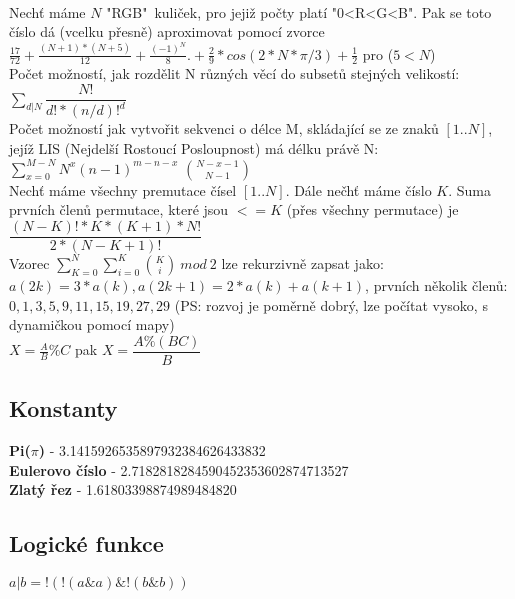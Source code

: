 \documentclass[11pt]{article}
\begin{document}
\\Nechť máme $N$ "RGB"\ kuliček, pro jejiž počty platí "0<R<G<B". Pak se toto číslo dá (vcelku přesně) aproximovat pomocí zvorce $\frac{17}{72}+\frac{(N+1)*(N+5)}{12}+\frac{(-1)^N}{8}.+\frac{2}{9}*cos(2*N*\pi/3)+\frac{1}{2}$ pro ($5<N$)
\\Počet možností, jak rozdělit N různých věcí do subsetů stejných velikostí: $\sum\limits_{d|N} \dfrac{N!}{d!*(n/d)!^d}$
\\Počet možností jak vytvořit sekvenci o délce \textsf{M}, skládající se ze znaků $[1..N]$, jejíž LIS (Nejdelší Rostoucí Posloupnost) má délku právě \textsf{N}: $\sum^{M-N}_{x=0}N^x(n-1)^{m-n-x}$  ${N-x-1}\choose{N-1}$
\\Nechť máme všechny premutace čísel $[1..N]$. Dále nečhť máme číslo $K$. Suma prvních členů permutace, které jsou $<=K$ (přes všechny permutace) je $\dfrac{(N-K)!*K*(K+1)*N!}{2*(N-K+1)!}$
\\Vzorec $\sum\limits_{K=0}^N \sum\limits_{i=0}^K {K\choose i}\ mod\ 2$ lze rekurzivně zapsat jako: $a(2k) = 3*a(k), a(2k+1) = 2*a(k) + a(k+1)$, prvních několik členů: ${0, 1, 3, 5, 9, 11, 15, 19, 27, 29}$ (PS: rozvoj je poměrně dobrý, lze počítat vysoko, s dynamičkou pomocí mapy)
\\$X=\frac{A}{B}\%C$ pak $X=\dfrac{A\%(BC)}{B}$
\subsection{Konstanty}
\textbf{Pi($\pi$)} - 3.1415926535897932384626433832 
\\\textbf{Eulerovo číslo} - 2.7182818284590452353602874713527
\\\textbf{Zlatý řez} - 1.61803398874989484820
\subsection{Logické funkce}
$a|b=!(!(a\&a)\&!(b\&b))$
\end{document}
